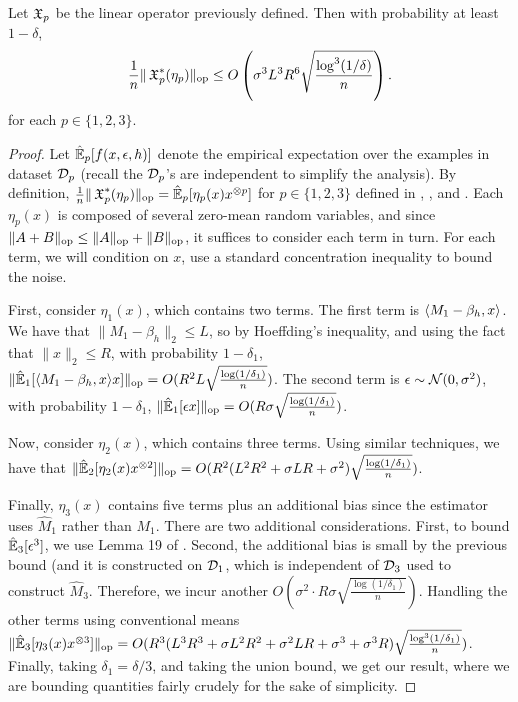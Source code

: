 \begin{lemma}
\label{lem:lowRankUpper}
Let $\operatorname{\mathfrak{X}}_p$ be the linear operator previously defined. Then with probability at least $1-\delta$,
$$\frac1{n} \|\operatorname{\mathfrak{X}}_p^*(\eta_p)\|_{\text{\rm op}} \le O\left(\sigma^3 L^3 R^6 \sqrt{\frac{\log^3(1/\delta)}{n}}\right).$$
for each $p \in \{1,2,3\}$.
\end{lemma}
\begin{proof}
Let $\hat{\operatorname{\mathbb{E}}}_p[f(x,\epsilon,h)]$ denote the empirical expectation over the examples in dataset $\mathcal{D}_p$
(recall the $\mathcal{D}_p$'s are independent to simplify the analysis).
By definition,
$\frac1n \|\operatorname{\mathfrak{X}}_p^*(\eta_p)\|_{\text{\rm op}} = \hat{\operatorname{\mathbb{E}}}_p[\eta_p(x) x^{\otimes p}]$
for $p \in \{1,2,3\}$ defined in , , and .
Each $\eta_p(x)$ is composed of several zero-mean random variables,
and since $\|A + B\|_{\text{\rm op}} \le \|A\|_{\text{\rm op}} + \|B\|_{\text{\rm op}}$,
it suffices to consider each term in turn.
For each term, we will condition on $x$, use a standard concentration inequality to
bound the noise.

First, consider $\eta_1(x)$, which contains two terms.
The first term is $\langle M_1 - \beta_h, x \rangle$.
We have that $\|M_1 - \beta_h\|_2 \le L$,
so by Hoeffding's inequality, and using the fact that $\|x\|_2 \le R$,
with probability $1-\delta_1$,
$\|\hat{\operatorname{\mathbb{E}}}_1[\langle M_1 - \beta_h, x \rangle x]\|_{\text{\rm op}} = O(R^2 L \sqrt{\frac{\log(1/\delta_1)}{n}})$.
The second term is $\epsilon \sim \mathcal{N}(0, \sigma^2)$,
with probability $1-\delta_1$,
$\|\hat{\operatorname{\mathbb{E}}}_1[\epsilon x]\|_{\text{\rm op}} = O(R \sigma \sqrt{\frac{\log(1/\delta_1)}{n}})$.

Now, consider $\eta_2(x)$, which contains three terms.
Using similar techniques, we have that
$\|\hat{\operatorname{\mathbb{E}}}_2[\eta_2(x) x^{\otimes 2}]\|_{\text{\rm op}} = O(R^2 (L^2 R^2 + \sigma L R + \sigma^2) \sqrt{\frac{\log(1/\delta_1)}{n}})$.

Finally, $\eta_3(x)$ contains five terms plus an additional bias since the estimator uses $\hat M_1$ rather than $M_1$.
There are two additional considerations.
First, to bound $\hat{\operatorname{\mathbb{E}}}_3[\epsilon^3]$, we use Lemma 19 of \cite{hsu13spherical}.
Second, the additional bias is small by the previous bound (and it is constructed on $\mathcal{D}_1$, which is independent of $\mathcal{D}_3$
used to construct $\hat M_3$.
Therefore, we incur another $O(\sigma^2 \cdot R \sigma \sqrt{\frac{\log(1/\delta_1)}{n}})$.
Handling the other terms using conventional means
$\|\hat{\operatorname{\mathbb{E}}}_3[\eta_3(x) x^{\otimes 3}]\|_{\text{\rm op}} = O(R^3 (L^3 R^3 + \sigma L^2 R^2 + \sigma^2 L R + \sigma^3 + \sigma^3 R) \sqrt{\frac{\log^3(1/\delta_1)}{n}})$.
Finally, taking $\delta_1 = \delta/3$, and taking the union bound,
we get our result, where we are bounding quantities fairly crudely for the sake of simplicity.
\end{proof}
